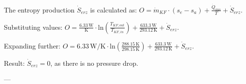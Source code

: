 The entropy production \( \dot{S}_{erz} \) is calculated as:  
\( O = \dot{m}_{KF} \cdot (s_e - s_a) + \frac{\dot{Q}_{aus}}{T} + \dot{S}_{erz} \).  

Substituting values:  
\( O = \frac{6.33 \, \text{W}}{\text{K}} \cdot \text{ln} \left( \frac{T_{KF,out}}{T_{KF,in}} \right) + \frac{633.3 \, \text{W}}{293.12 \, \text{K}} + \dot{S}_{erz} \).  

Expanding further:  
\( O = 6.33 \, \text{W/K} \cdot \text{ln} \left( \frac{288.15 \, \text{K}}{298.15 \, \text{K}} \right) + \frac{633.3 \, \text{W}}{293.12 \, \text{K}} + \dot{S}_{erz} \).  

Result:  
\( \dot{S}_{erz} = 0 \), as there is no pressure drop.  

---